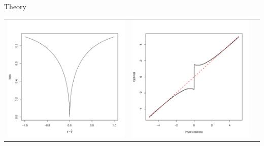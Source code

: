 \documentclass[final]{beamer}
\newlength{\onecolwid}
\begin{document}
\begin{frame}[t]
\begin{columns}[t]
\begin{column}{\onecolwid}
\begin{block}{Theory}
\begin{center}
\begin{tabular}{cc|c}
\includegraphics[scale = 0.6, trim = 1in 1in 0.5in 1in, clip]{loss_3.pdf} &
\includegraphics[scale = 0.6, trim = 1in 1in 0.5in 1in, clip]{zero2.pdf}\\

\end{tabular}
\end{center}
\end{block}
\end{column}
\end{columns}
\end{frame}
\end{document}
